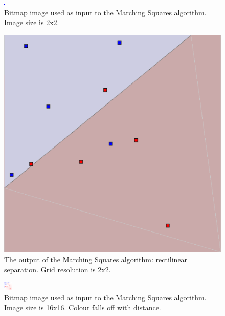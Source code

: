 \documentclass[12pt]{article}
\begin{document}
\begin{figure} 
\centering
  \includegraphics[width = 3 in]{2_res_image.png}
  \caption{Bitmap image used as input to the Marching Squares algorithm.
Image size is 2x2.
}
\end{figure}


\begin{figure} 
\centering
  \includegraphics[width = 3 in]{2_res.png}
  \caption{The output of the Marching Squares algorithm: rectilinear separation. Grid resolution is 2x2.
}
\end{figure}






\begin{figure} 
\centering
  \includegraphics[width = 3 in]{16_res_image.png}
  \caption{Bitmap image used as input to the Marching Squares algorithm.
Image size is 16x16.
Colour falls off with distance.
}
\end{figure}
\end{document}
